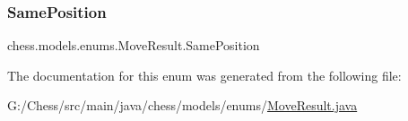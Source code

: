 \subsubsection{\texorpdfstring{Same\+Position}{SamePosition}}
{\footnotesize\ttfamily chess.\+models.\+enums.\+Move\+Result.\+Same\+Position}



The documentation for this enum was generated from the following file\+:\begin{DoxyCompactItemize}
\item 
G\+:/\+Chess/src/main/java/chess/models/enums/\mbox{\hyperlink{_move_result_8java}{Move\+Result.\+java}}\end{DoxyCompactItemize}
